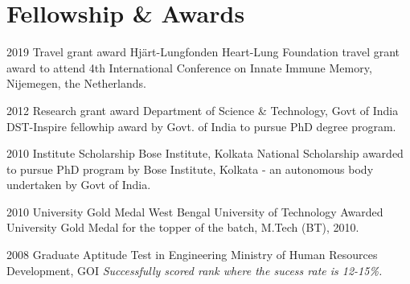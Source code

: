 \documentclass[]{friggeri-cv}
\begin{document}
\newpage
\section{Fellowship \& Awards}
\begin{entrylist}
\entry
	{2019}
	{Travel grant award}
	{Hjärt-Lungfonden}
	{Heart-Lung Foundation travel grant award to attend 4th International Conference on Innate Immune Memory, Nijemegen, the Netherlands.}
	
\entry
	{2012}
	{Research grant award}
	{Department of Science \& Technology, Govt of India}
	{DST-Inspire fellowhip award by Govt. of India to pursue PhD degree program.}
	
\entry
	{2010}
	{Institute Scholarship}
	{Bose Institute, Kolkata}
	{National Scholarship awarded to pursue PhD program by Bose Institute, Kolkata - an autonomous body undertaken by Govt of India.}
	
\entry
	{2010}
	{University Gold Medal}
	{West Bengal University of Technology}
	{Awarded University Gold Medal for the topper of the batch, M.Tech (BT), 2010.}
	
\entry
	{2008}
	{Graduate Aptitude Test in Engineering}
	{Ministry of Human Resources Development, GOI}
	{\textit{Successfully scored rank where the sucess rate is 12-15\%.}}
\end{entrylist}
\end{document}
